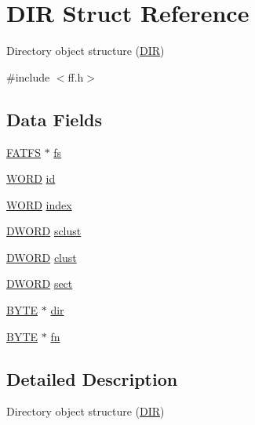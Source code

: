 \hypertarget{structDIR}{\section{D\-I\-R Struct Reference}
\label{structDIR}
}


Directory object structure (\hyperlink{structDIR}{D\-I\-R})  




{\ttfamily \#include $<$ff.\-h$>$}

\subsection*{Data Fields}
\begin{DoxyCompactItemize}
\item 
\hyperlink{structFATFS}{F\-A\-T\-F\-S} $\ast$ \hyperlink{structDIR_a312eaa66cb703fb2993ea98173dc0c9a}{fs}
\item 
\hyperlink{integer_8h_a197942eefa7db30960ae396d68339b97}{W\-O\-R\-D} \hyperlink{structDIR_aca2c95a99a04173917ec70c030891383}{id}
\item 
\hyperlink{integer_8h_a197942eefa7db30960ae396d68339b97}{W\-O\-R\-D} \hyperlink{structDIR_ab95119fbacbe45e3e9ee0f962b844092}{index}
\item 
\hyperlink{integer_8h_ad342ac907eb044443153a22f964bf0af}{D\-W\-O\-R\-D} \hyperlink{structDIR_a9212af5877b94d790dd3bab3aa320994}{sclust}
\item 
\hyperlink{integer_8h_ad342ac907eb044443153a22f964bf0af}{D\-W\-O\-R\-D} \hyperlink{structDIR_acfbb8ba2d6e73b6f999ceffd1857c190}{clust}
\item 
\hyperlink{integer_8h_ad342ac907eb044443153a22f964bf0af}{D\-W\-O\-R\-D} \hyperlink{structDIR_ad01fcc812ed0dad11a593574336adc9e}{sect}
\item 
\hyperlink{integer_8h_a4ae1dab0fb4b072a66584546209e7d58}{B\-Y\-T\-E} $\ast$ \hyperlink{structDIR_a6c2a8c0cf2d55ae99775e93a16593449}{dir}
\item 
\hyperlink{integer_8h_a4ae1dab0fb4b072a66584546209e7d58}{B\-Y\-T\-E} $\ast$ \hyperlink{structDIR_a32da2f31d6c3b6c42eef981cb0cfd2ee}{fn}
\end{DoxyCompactItemize}


\subsection{Detailed Description}
Directory object structure (\hyperlink{structDIR}{D\-I\-R}) 

